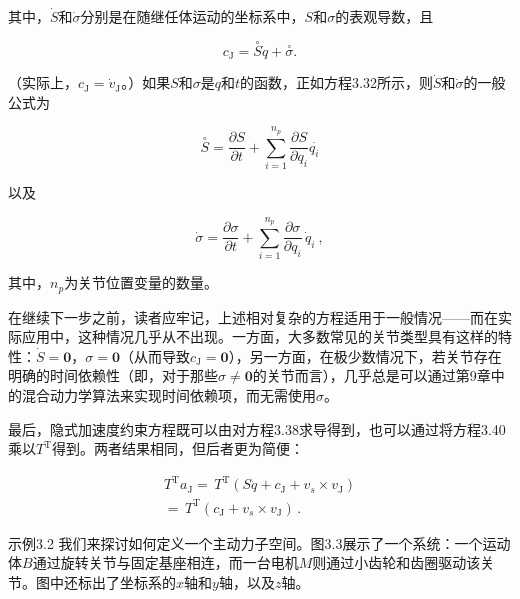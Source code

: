 \documentclass[10pt,a4paper]{book}
\theoremstyle{thmstyle} %
\theoremstyle{defstyle} %
\theoremstyle{prostyle} %
\begin{document}
其中，$\dot{S}$和$\dot{\sigma}$分别是在随继任体运动的坐标系中，$S$和$\sigma$的表观导数，且



$$
c _ { \mathrm { J } } = \stackrel { \circ } { S } \dot { q } + \stackrel { \circ } { \sigma } .
$$



（实际上，$c_{\mathrm{J}}=\dot{v}_{\mathrm{J}}$。）如果$S$和$\sigma$是$q$和$t$的函数，正如方程3.32所示，则$\dot{S}$和$\dot{\sigma}$的一般公式为



$$
\stackrel { \circ } { S } = \frac { \partial S } { \partial t } + \sum _ { i = 1 } ^{n _ { p} } \frac { \partial S } { \partial q _ { i } } \stackrel { \cdot } { q _ { i } }
$$



以及



$$
\dot { \sigma } = \frac { \partial \sigma } { \partial t } + \sum _ { i = 1 } ^{n _ { p} } \frac { \partial \sigma } { \partial q _ { i } } \, \dot { q } _ { i } \ ,
$$



其中，$n_{p}$为关节位置变量的数量。



在继续下一步之前，读者应牢记，上述相对复杂的方程适用于一般情况——而在实际应用中，这种情况几乎从不出现。一方面，大多数常见的关节类型具有这样的特性：$\dot{S} = \mathbf{0}$，$\sigma = \mathbf{0}$（从而导致$c_{\mathrm{J}} = \mathbf{0}$），另一方面，在极少数情况下，若关节存在明确的时间依赖性（即，对于那些$\sigma \neq \mathbf{0}$的关节而言），几乎总是可以通过第9章中的混合动力学算法来实现时间依赖项，而无需使用$\sigma$。



最后，隐式加速度约束方程既可以由对方程3.38求导得到，也可以通过将方程3.40乘以$T^{\mathrm{T}}$得到。两者结果相同，但后者更为简便：



$$
\begin{array}{r} { T ^{\mathrm { T} } a _ { \mathrm { J } } = \, T ^{\mathrm { T} } ( S \ddot { q } + c _ { \mathrm { J } } + v _ { s } \times v _ { \mathrm { J } } ) } \\{ = \, T ^{\mathrm { T} } ( c _ { \mathrm { J } } + v _ { s } \times v _ { \mathrm { J } } ) \, . } \end{array}
$$



示例3.2 我们来探讨如何定义一个主动力子空间。图3.3展示了一个系统：一个运动体$B$通过旋转关节与固定基座相连，而一台电机$M$则通过小齿轮和齿圈驱动该关节。图中还标出了坐标系的$x$轴和$y$轴，以及$z$轴。
\end{document}
